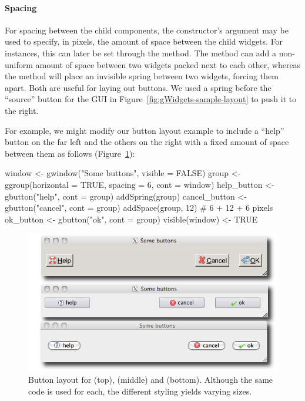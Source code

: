 \paragraph{Spacing}
For spacing between the child components, the constructor's argument
 may be used to specify, in pixels, the
amount of space between the child widgets. For 
instances, this can later be set through the 
method. The method  can add a non-uniform
amount of space between two widgets packed next to each other, whereas
the method  will place an invisible spring
between two widgets, forcing them apart.  Both are useful for laying
out buttons. We used a spring before the ``source'' button for the GUI
in Figure~\ref{fig:gWidgets-sample-layout} to push it to the right.


For example, we might modify our button layout example to include a
``help'' button on the far left and the others on the right with a
fixed amount of space between them as follows (Figure~\ref{fig:gWidgets-button-layout}):
\begin{Schunk}
\begin{Sinput}
 window <- gwindow("Some buttons", visible = FALSE)
 group <- ggroup(horizontal = TRUE, spacing = 6, cont = window)
 help_button <- gbutton("help", cont = group)
 addSpring(group)
 cancel_button <- gbutton("cancel", cont = group)
 addSpace(group, 12)                         # 6 + 12 + 6 pixels
 ok_button <- gbutton("ok", cont = group)
 visible(window) <- TRUE
\end{Sinput}
\end{Schunk}


\begin{figure}
  \centering
  \includegraphics[width=.7\textwidth]{fig-gWidgets-buttons}
  \caption{Button layout for  (top),  (middle)
    and  (bottom). Although the same code is used for each, the different styling yields varying sizes. }
  \label{fig:gWidgets-button-layout}
\end{figure}

